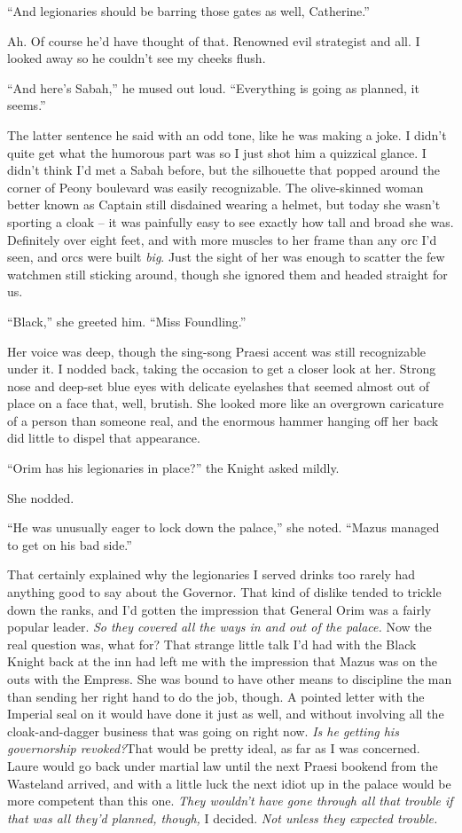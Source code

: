 \documentclass[12pt, openany]{book}
\begin{document}
“And legionaries should be barring those gates as well, Catherine.”

Ah. Of course he’d have thought of that. Renowned evil strategist and all. I looked away so he couldn’t see my cheeks flush.

“And here’s Sabah,” he mused out loud. “Everything is going as planned, it seems.”

The latter sentence he said with an odd tone, like he was making a joke. I didn’t quite get what the humorous part was so I just shot him a quizzical glance. I didn’t think I’d met a Sabah before, but the silhouette that popped around the corner of Peony boulevard was easily recognizable. The olive-skinned woman better known as Captain still disdained wearing a helmet, but today she wasn’t sporting a cloak – it was painfully easy to see exactly how tall and broad she was. Definitely over eight feet, and with more muscles to her frame than any orc I’d seen, and orcs were built \textit{big}. Just the sight of her was enough to scatter the few watchmen still sticking around, though she ignored them and headed straight for us.

“Black,” she greeted him. “Miss Foundling.”

Her voice was deep, though the sing-song Praesi accent was still recognizable under it. I nodded back, taking the occasion to get a closer look at her. Strong nose and deep-set blue eyes with delicate eyelashes that seemed almost out of place on a face that, well, brutish. She looked more like an overgrown caricature of a person than someone real, and the enormous hammer hanging off her back did little to dispel that appearance.

“Orim has his legionaries in place?” the Knight asked mildly.

She nodded.

“He was unusually eager to lock down the palace,” she noted. “Mazus managed to get on his bad side.”

That certainly explained why the legionaries I served drinks too rarely had anything good to say about the Governor. That kind of dislike tended to trickle down the ranks, and I’d gotten the impression that General Orim was a fairly popular leader. \textit{So they covered all the ways in and out of the palace.} Now the real question was, what for? That strange little talk I’d had with the Black Knight back at the inn had left me with the impression that Mazus was on the outs with the Empress. She was bound to have other means to discipline the man than sending her right hand to do the job, though. A pointed letter with the Imperial seal on it would have done it just as well, and without involving all the cloak-and-dagger business that was going on right now. \textit{Is he getting his governorship revoked?}That would be pretty ideal, as far as I was concerned. Laure would go back under martial law until the next Praesi bookend from the Wasteland arrived, and with a little luck the next idiot up in the palace would be more competent than this one. \textit{They wouldn’t have gone through all that trouble if that was all they’d planned, though,} I decided. \textit{Not unless they expected trouble.}
\end{document}
